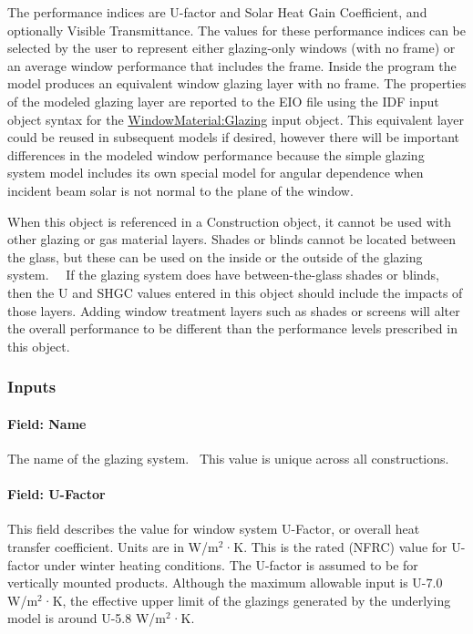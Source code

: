The performance indices are U-factor and Solar Heat Gain Coefficient, and optionally Visible Transmittance. The values for these performance indices can be selected by the user to represent either glazing-only windows (with no frame) or an average window performance that includes the frame. Inside the program the model produces an equivalent window glazing layer with no frame. The properties of the modeled glazing layer are reported to the EIO file using the IDF input object syntax for the \hyperref[windowmaterialglazing]{WindowMaterial:Glazing} input object. This equivalent layer could be reused in subsequent models if desired, however there will be important differences in the modeled window performance because the simple glazing system model includes its own special model for angular dependence when incident beam solar is not normal to the plane of the window.

When this object is referenced in a Construction object, it cannot be used with other glazing or gas material layers. Shades or blinds cannot be located between the glass, but these can be used on the inside or the outside of the glazing system.~~ If the glazing system does have between-the-glass shades or blinds, then the U and SHGC values entered in this object should include the impacts of those layers. Adding window treatment layers such as shades or screens will alter the overall performance to be different than the performance levels prescribed in this object.

\subsubsection{Inputs}\label{inputs-21-006}

\paragraph{Field: Name}\label{field-name-15-009}

The name of the glazing system.~ This value is unique across all constructions.

\paragraph{Field: U-Factor}\label{field-u-factor}

This field describes the value for window system U-Factor, or overall heat transfer coefficient. Units are in W/m\(^{2}\)·K. This is the rated (NFRC) value for U-factor under winter heating conditions. The U-factor is assumed to be for vertically mounted products. Although the maximum allowable input is U-7.0 W/m\(^{2}\)·K, the effective upper limit of the glazings generated by the underlying model is around U-5.8 W/m\(^{2}\)·K.

